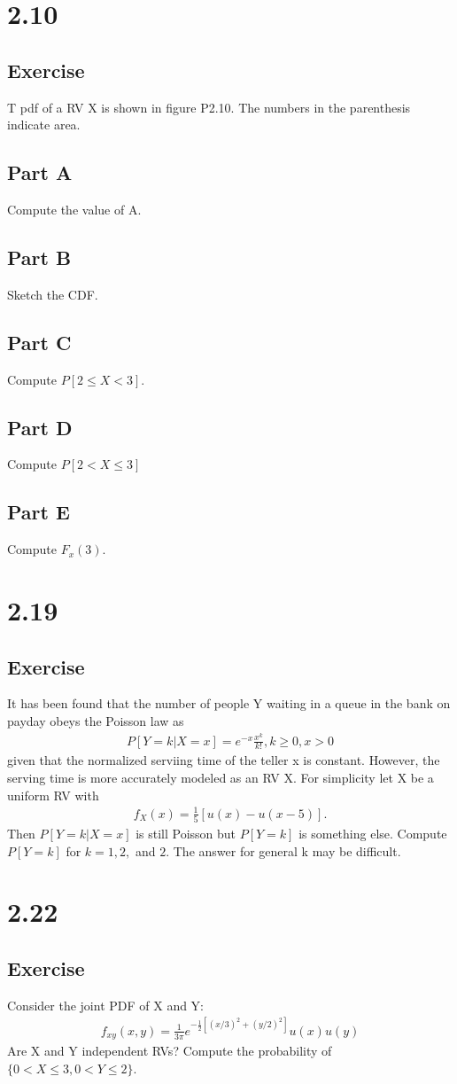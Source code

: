 \documentclass[12pt]{article}
\begin{document}
\section{2.10}

\subsection{Exercise}
T pdf of a RV X is shown in figure P2.10. The numbers in the parenthesis indicate area. 
\subsection{Part A}
Compute the value of A.
\subsection{Part B}
Sketch the CDF.
\subsection{Part C}
Compute $P[2\leq X<3]$.
\subsection{Part D}
Compute $P[2<X\leq 3]$
\subsection{Part E}
Compute $F_x(3)$.

\section{2.19}
\subsection{Exercise}
It has been found that the number of people Y waiting in a queue in the bank on payday obeys the Poisson law as
\begin{align*}
P[Y=k|X=x]=e^{-x}\frac{x^k}{k!}, k\geq0, x>0
\end{align*}
given that the normalized serviing time of the teller x is constant. However, the serving time is more accurately modeled
as an RV X. For simplicity let X be a uniform RV with 
\begin{align*}
f_X(x)=\frac{1}{5}[u(x)-u(x-5)].
\end{align*}
Then $P[Y=k|X=x]$ is still Poisson but $P[Y=k]$ is something else. Compute $P[Y=k]$ for $k=1,2,$ and $2$. The answer for
general k may be difficult.

\section{2.22}
\subsection{Exercise}
Consider the joint PDF of X and Y:\\
\begin{align*}
f_{xy}(x,y)=\frac{1}{3\pi}e^{-\frac{1}{2}[(x/3)^2+(y/2)^2]}u(x)u(y)
\end{align*}
Are X and Y independent RVs? Compute the probability of $\{0<X\leq3, 0<Y\leq2\}$.
\end{document}
